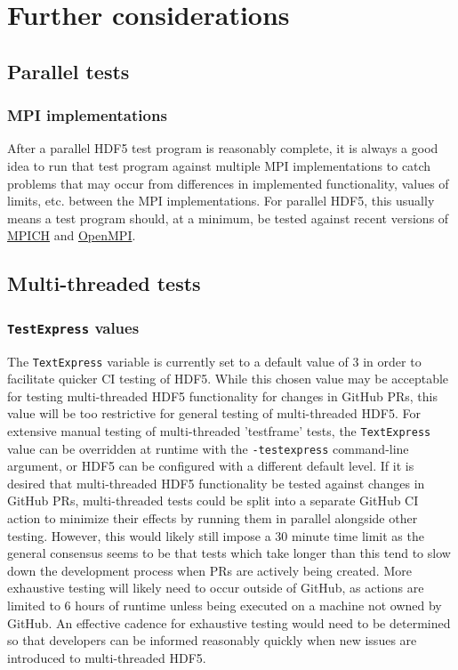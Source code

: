 \documentclass[../HDF5_RFC.tex]{subfiles}
\begin{document}
\section{Further considerations}
\label{further_considerations}

\subsection{Parallel tests}

\subsubsection{MPI implementations}

After a parallel HDF5 test program is reasonably complete, it is always a good idea to run that test
program against multiple MPI implementations to catch problems that may occur from differences in
implemented functionality, values of limits, etc. between the MPI implementations. For parallel HDF5,
this usually means a test program should, at a minimum, be tested against recent versions of
\href{https://www.mpich.org/}{MPICH} and \href{https://www.open-mpi.org/}{OpenMPI}.

\subsection{Multi-threaded tests}

\subsubsection{\texttt{TestExpress} values}

The \texttt{TextExpress} variable is currently set to a default value of 3 in order to facilitate quicker
CI testing of HDF5. While this chosen value may be acceptable for testing multi-threaded HDF5 functionality
for changes in GitHub PRs, this value will be too restrictive for general testing of multi-threaded HDF5.
For extensive manual testing of multi-threaded 'testframe' tests, the \texttt{TextExpress} value can be overridden at runtime with the \texttt{-testexpress} command-line argument, or HDF5 can be configured with
a different default level. If it is desired that multi-threaded HDF5 functionality be tested against changes
in GitHub PRs, multi-threaded tests could be split into a separate GitHub CI action to minimize their
effects by running them in parallel alongside other testing. However, this would likely still impose a
30 minute time limit as the general consensus seems to be that tests which take longer than this tend to
slow down the development process when PRs are actively being created. More exhaustive testing will likely
need to occur outside of GitHub, as actions are limited to 6 hours of runtime unless being executed on a machine not owned by GitHub. An effective cadence for exhaustive testing would need to be determined so
that developers can be informed reasonably quickly when new issues are introduced to multi-threaded HDF5.
\end{document}
